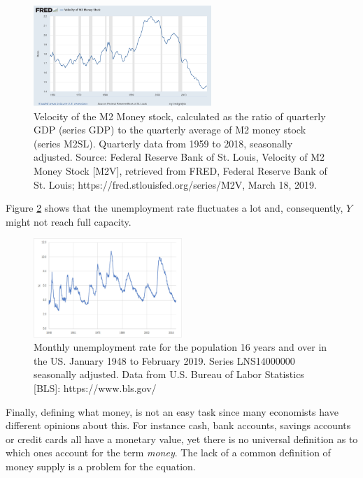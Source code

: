 \documentclass[11pt,a4paper,oneside]{book}
\begin{document}
\begin{figure}[h]
  \centering
    \includegraphics[width=0.6\textwidth]{M2_velocity.png}
    \caption{Velocity of the M2 Money stock, calculated as the ratio of quarterly GDP (series GDP) to the quarterly average of M2 money stock (series M2SL). Quarterly data from 1959 to 2018, seasonally adjusted. Source: Federal Reserve Bank of St. Louis, Velocity of M2 Money Stock [M2V], retrieved from FRED, Federal Reserve Bank of St. Louis; https://fred.stlouisfed.org/series/M2V, March 18, 2019.}
    \label{fig:M2_velocity}
\end{figure}

Figure \ref{fig:unempl_US} shows that the unemployment rate fluctuates a lot and, consequently, $Y$ might not reach full capacity.

\begin{figure}[H]
  \centering
    \includegraphics[width=0.50\textwidth]{unempl_US.jpg}
    \caption{Monthly unemployment rate for the population 16 years and over in the US. January 1948 to February 2019. Series LNS14000000 seasonally adjusted. Data from U.S. Bureau of Labor Statistics [BLS]: https://www.bls.gov/}
    \label{fig:unempl_US}
\end{figure}

Finally, defining what money, is not an easy task since many economists have different opinions about this. For instance cash, bank accounts, savings accounts or credit cards all have a monetary value, yet there is no universal definition as to which ones account for the term \textit{money}. The lack of a common definition of money supply is a problem for the equation.
\end{document}
